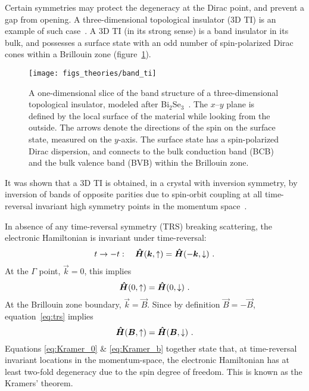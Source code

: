 Certain symmetries may protect the degeneracy at the Dirac point, and prevent a gap from opening. A three-dimensional topological insulator (3D TI) is an example of such case~\cite{TI_Qi, TI_Col}. A 3D TI (in its strong sense) is a band insulator in its bulk, and possesses a surface state with an odd number of spin-polarized Dirac cones within a Brillouin zone (figure~\ref{fig:bg_ti}). %
\begin{figure}[ht]%
    \centering%
    \texttt{[image: figs\_theories/band\_ti]}%
    \caption[Band structure of a 3D topological insulator]{\label{fig:bg_ti}A one-dimensional slice of the band structure of a three-dimensional topological insulator, modeled after Bi$_2$Se$_3$~\cite{TI_electronic_structure_zhang}. The $x$--$y$ plane is defined by the local surface of the material while looking from the outside. The arrows denote the directions of the spin on the surface state, measured on the $y$-axis. The surface state has a spin-polarized Dirac dispersion, and connects to the bulk conduction band (BCB) and the bulk valence band (BVB) within the Brillouin zone.}%
\end{figure}%
%
It was shown that a 3D TI is obtained, in a crystal with inversion symmetry, by inversion of bands of opposite parities due to spin-orbit coupling at all time-reversal invariant high symmetry points in the momentum space~\cite{Fu2007}.

In absence of any time-reversal symmetry (TRS) breaking scattering, the electronic Hamiltonian is invariant under time-reversal:%
\begin{equation}%
    t \to -t: \quad \op{H}(\vec{k}, \uparrow) = \op{H}(-\vec{k}, \downarrow)~.\label{eq:trs}%
\end{equation}%
At the $\Gamma$ point, $\vec{k}=0$, this implies%
\begin{equation}%
    \op{H}(0, \uparrow) = \op{H}(0, \downarrow)~.\label{eq:Kramer_0}%
\end{equation}%
At the Brillouin zone boundary, $\vec{k} = \vec{B}$. Since by definition $\vec{B} = -\vec{B}$, equation~\ref{eq:trs} implies%
\begin{equation}%
    \op{H}(\vec{B}, \uparrow) = \op{H}(\vec{B}, \downarrow)~.\label{eq:Kramer_b}%
\end{equation}%
Equations \ref{eq:Kramer_0} \& \ref{eq:Kramer_b} together state that, at time-reversal invariant locations in the momentum-space, the electronic Hamiltonian has at least two-fold degeneracy due to the spin degree of freedom. This is known as the Kramers' theorem.

